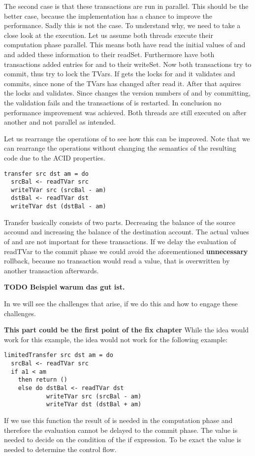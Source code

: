 The second case is that these transactions are run in parallel. This should be the better case, because the implementation
has a chance to improve the performance. Sadly this is not the case. To understand why, we need to take a close look at 
the execution. Let us assume both threads execute their computation phase parallel. This means both have read the initial 
values of  and  and added these information to their readSet. Furthermore have both transactions 
added entries for  and  to their writeSet. Now both transactions try to commit, thus try to lock 
the TVars. If  gets the locks for  and  it validates and commits, since none of 
the TVars has changed after  read it. After that  aquires the locks and validates.
Since  changes the version numbers of  and  by committing, the validation fails
and the transactions of  is restarted. 
In conclusion no performance improvement was achieved. Both threads are still executed 
on after another and not parallel as intended.

Let us rearrange the operations of  to see how this can be improved. Note that we can rearrange the 
operations without changing the semantics of the resulting code due to the ACID properties. 
\begin{lstlisting}
transfer src dst am = do
  srcBal <- readTVar src
  writeTVar src (srcBal - am)
  dstBal <- readTVar dst
  writeTVar dst (dstBal - am)
\end{lstlisting}
Transfer basically consists of two parts. Decreasing the balance of the source accound and increasing the 
balance of the destination account. The actual values of  and  are not important for
these transactions. If we delay the evaluation of readTVar to the commit phase we could avoid the 
aforementioned \textbf{unnecessary} rollback, because no transaction would read a value, that is overwritten
by another transaction afterwards. 

\textbf{TODO Beispiel warum das gut ist.}

In %
we will see the challenges that arise, if we do this and how to engage these challenges.




\textbf{This part could be the first point of the fix chapter}
While the idea would work for this example, the idea would not work 
for the following example:
\begin{lstlisting}
limitedTransfer src dst am = do 
  srcBal <- readTVar src
  if a1 < am
    then return ()
    else do dstBal <- readTVar dst
            writeTVar src (srcBal - am)
            writeTVar dst (dstBal + am)
\end{lstlisting}
If we use this function the result of  is needed in the computation phase and therefore 
the evaluation cannot be delayed to the commit phase. The value is needed to decide on the condition of the 
if expression. To be exact the value is needed to determine the control flow. 

